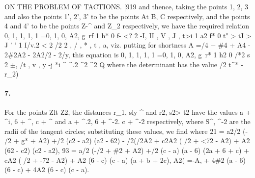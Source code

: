 \documentclass[11pt,a4paper]{book}
\begin{document}
ON    THE    PROBLEM    OF    TACTIONS.
[919
and  thence,  taking  the  points  1,  2,  3  and  also  the  points  1',  2',  3'  to  be  the  points
At  B,  C  respectively,  and  the  points  4  and  4'  to  be  the  points  Z-^  and  Z_2  respectively,
we  have  the  required  relation
0,  1,     1,     1,     1      =0,
1,  0,     A2,     g\     rf
1        h*       0         f-       <? 2
-I,        II  ,        V  ,      J     ,        t>i
1      a2     f*     0       t"
>          iJ    >         J      '  '  1
I/v.2  < 2          /2  2
,       /   ,       *  ,      t   ,      a,
viz.  putting  for  shortness
A  =/4  +  \#4  +  A4  -  2\#2A2  -  2A2/2  -  2/y,
this  equation  is
0,  1,     1,     1,     1       =0,
1,  0,     A2,     g\     r*
1        h2       0         /*2       s 2
$\pm$,      /t ,      v ,    y  -j      *i
^  ^.2  ^2  ^2          Q
where  the  determinant  has  the  value
/2
t^* - r_2)
\paragraph{7.} For  the  points  Zlt  Z2,  the  distances  r_1,  sly  ^  and  r2,  s2>  t2  have  the  values
a  +  ^i,  6  +  ^,  c  +  ^  and  a  +  ^.2,  6  +  ^-2.  c  +  ^-2  respectively,  where  S^,  ^-2  are  the  radii
of  the  tangent  circles;  substituting  these  values,  we  find
where
21  =     a2/2  (-  /2  +  g*  +  A2)  +/2  (c2  -  a2)  (a2  -  62)  -  /2(/2A2
+  c2A2  (    /2  +  <72  -  A2)  +  A2  (62  -  c2)  (c2  -  a2),
93  =     a/2  (-/2  +  \#2  +  A2)  +/2  (c  -  a)  (a  -  6)  (2a  +  6  +  c)
+  cA2  (    /2  +  -72  -  A2)  +  A2  (6  -  c)  (c  -  a)  (a  +  b  +  2c),
A2(
=-A,
+  4\#2  (a  -  6)  (6  -  c)
+  4A2  (6  -  c)  (c  -  a).
\end{document}
